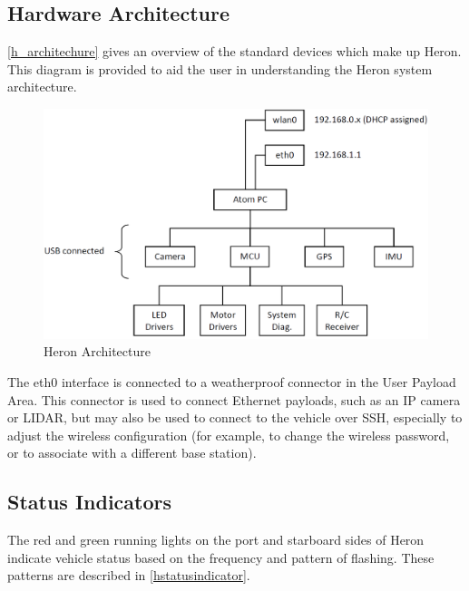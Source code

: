 \documentclass[]{clearpath-latex/clearpath-manual}
\begin{document}
\newpage

\subsection{Hardware Architecture}
\autoref{h_architechure} gives an overview of the standard devices which make up Heron. This diagram is provided to aid the user in understanding the Heron system architecture.

\begin{figure}[h]
  \centering
  \includegraphics[width=0.75\linewidth]{h-architecture.PNG}
  \caption{Heron Architecture}
  \label{h_architechure}
\end{figure}


The eth0 interface is connected to a weatherproof connector in the User Payload Area. This connector is used to connect Ethernet payloads, such as an IP camera or LIDAR, but may also be used to connect to the vehicle over SSH, especially to adjust the wireless configuration (for example, to change the wireless password, or to associate with a different base station).
\newpage
\subsection{Status Indicators} \label{statusindicators}
The red and green running lights on the port and starboard sides of Heron indicate vehicle status based on the frequency and pattern of flashing. These patterns are described in \autoref{hstatusindicator}.
\end{document}
